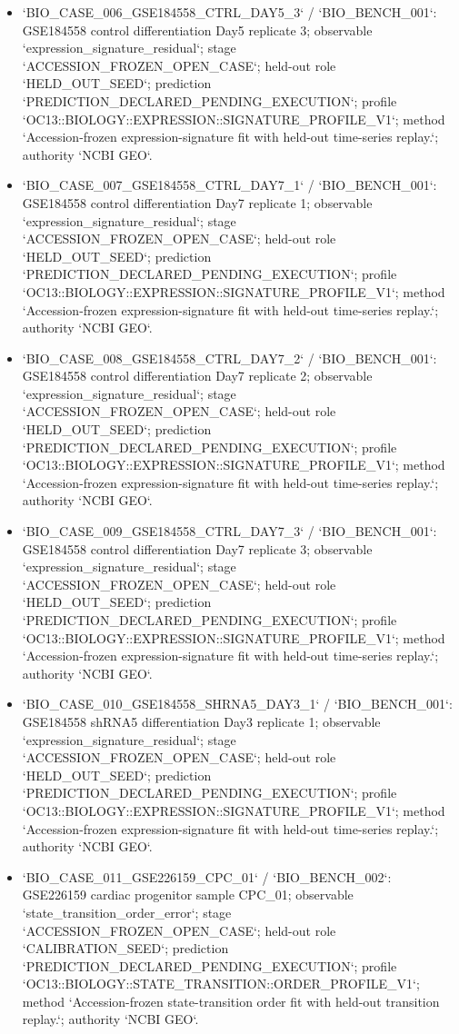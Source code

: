 \begin{itemize}
\item `BIO\_CASE\_006\_GSE184558\_CTRL\_DAY5\_3` / `BIO\_BENCH\_001`: GSE184558 control differentiation Day5 replicate 3; observable `expression\_signature\_residual`; stage `ACCESSION\_FROZEN\_OPEN\_CASE`; held-out role `HELD\_OUT\_SEED`; prediction `PREDICTION\_DECLARED\_PENDING\_EXECUTION`; profile `OC13::BIOLOGY::EXPRESSION::SIGNATURE\_PROFILE\_V1`; method `Accession-frozen expression-signature fit with held-out time-series replay.`; authority `NCBI GEO`.
\item `BIO\_CASE\_007\_GSE184558\_CTRL\_DAY7\_1` / `BIO\_BENCH\_001`: GSE184558 control differentiation Day7 replicate 1; observable `expression\_signature\_residual`; stage `ACCESSION\_FROZEN\_OPEN\_CASE`; held-out role `HELD\_OUT\_SEED`; prediction `PREDICTION\_DECLARED\_PENDING\_EXECUTION`; profile `OC13::BIOLOGY::EXPRESSION::SIGNATURE\_PROFILE\_V1`; method `Accession-frozen expression-signature fit with held-out time-series replay.`; authority `NCBI GEO`.
\item `BIO\_CASE\_008\_GSE184558\_CTRL\_DAY7\_2` / `BIO\_BENCH\_001`: GSE184558 control differentiation Day7 replicate 2; observable `expression\_signature\_residual`; stage `ACCESSION\_FROZEN\_OPEN\_CASE`; held-out role `HELD\_OUT\_SEED`; prediction `PREDICTION\_DECLARED\_PENDING\_EXECUTION`; profile `OC13::BIOLOGY::EXPRESSION::SIGNATURE\_PROFILE\_V1`; method `Accession-frozen expression-signature fit with held-out time-series replay.`; authority `NCBI GEO`.
\item `BIO\_CASE\_009\_GSE184558\_CTRL\_DAY7\_3` / `BIO\_BENCH\_001`: GSE184558 control differentiation Day7 replicate 3; observable `expression\_signature\_residual`; stage `ACCESSION\_FROZEN\_OPEN\_CASE`; held-out role `HELD\_OUT\_SEED`; prediction `PREDICTION\_DECLARED\_PENDING\_EXECUTION`; profile `OC13::BIOLOGY::EXPRESSION::SIGNATURE\_PROFILE\_V1`; method `Accession-frozen expression-signature fit with held-out time-series replay.`; authority `NCBI GEO`.
\item `BIO\_CASE\_010\_GSE184558\_SHRNA5\_DAY3\_1` / `BIO\_BENCH\_001`: GSE184558 shRNA5 differentiation Day3 replicate 1; observable `expression\_signature\_residual`; stage `ACCESSION\_FROZEN\_OPEN\_CASE`; held-out role `HELD\_OUT\_SEED`; prediction `PREDICTION\_DECLARED\_PENDING\_EXECUTION`; profile `OC13::BIOLOGY::EXPRESSION::SIGNATURE\_PROFILE\_V1`; method `Accession-frozen expression-signature fit with held-out time-series replay.`; authority `NCBI GEO`.
\item `BIO\_CASE\_011\_GSE226159\_CPC\_01` / `BIO\_BENCH\_002`: GSE226159 cardiac progenitor sample CPC\_01; observable `state\_transition\_order\_error`; stage `ACCESSION\_FROZEN\_OPEN\_CASE`; held-out role `CALIBRATION\_SEED`; prediction `PREDICTION\_DECLARED\_PENDING\_EXECUTION`; profile `OC13::BIOLOGY::STATE\_TRANSITION::ORDER\_PROFILE\_V1`; method `Accession-frozen state-transition order fit with held-out transition replay.`; authority `NCBI GEO`.

\end{itemize}
